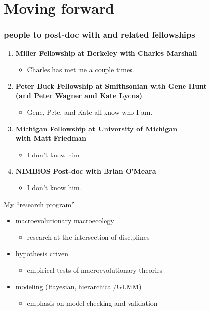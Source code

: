 \documentclass{beamer}
\begin{document}
\section{Moving forward}

\begin{frame}
  \frametitle{people to post-doc with and related fellowships}
  \begin{enumerate}
    \item \textbf{Miller Fellowship at Berkeley with Charles Marshall}
      \begin{itemize}
        \item Charles has met me a couple times.
      \end{itemize}
    \item \textbf{Peter Buck Fellowship at Smithsonian with Gene Hunt \\(and Peter Wagner and Kate Lyons)}
      \begin{itemize}
        \item Gene, Pete, and Kate all know who I am.
      \end{itemize}
    \item \textbf{Michigan Fellowship at University of Michigan \\with Matt Friedman}
      \begin{itemize}
        \item I don't know him
      \end{itemize}
    \item \textbf{NIMBiOS Post-doc with Brian O'Meara}
      \begin{itemize}
        \item I don't know him.
      \end{itemize}
  \end{enumerate}
\end{frame}


\begin{frame}
  \begin{block}{My ``research program''}
    \begin{itemize}
      \item macroevolutionary macroecology
        \begin{itemize}
          \item research at the intersection of disciplines
        \end{itemize}
      \item hypothesis driven
        \begin{itemize}
          \item empirical tests of macroevolutionary theories
        \end{itemize}
      \item modeling (Bayesian, hierarchical/GLMM)
        \begin{itemize}
          \item emphasis on model checking and validation
        \end{itemize}
    \end{itemize}
  \end{block}
\end{frame}
\end{document}
